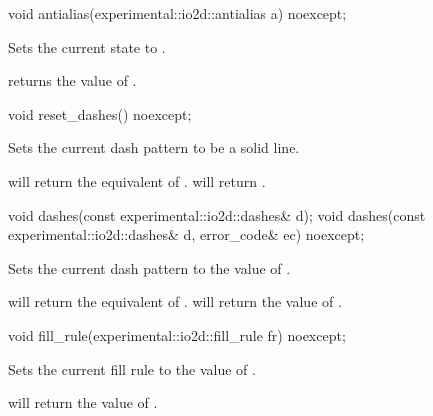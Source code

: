 \begin{itemdecl}
void antialias(experimental::io2d::antialias a) noexcept;
\end{itemdecl}
\begin{itemdescr}
	\pnum
	\effects
	Sets the current  state to .
	
	\pnum
	\postconditions
	 returns the value of .
\end{itemdescr}

\begin{itemdecl}
void reset_dashes() noexcept;
\end{itemdecl}
\begin{itemdescr}
	\pnum
	\effects
	Sets the current dash pattern to be a solid line.
	
	\pnum
	\postconditions
	 will return the equivalent of .  will return .
\end{itemdescr}

\begin{itemdecl}
void dashes(const experimental::io2d::dashes& d);
void dashes(const experimental::io2d::dashes& d, error_code& ec) noexcept;
\end{itemdecl}
\begin{itemdescr}
	\pnum
	\effects
	Sets the current dash pattern to the value of .
	
	\pnum
	\postconditions
	 will return the equivalent of .  will return the value of .
\end{itemdescr}

\begin{itemdecl}
void fill_rule(experimental::io2d::fill_rule fr) noexcept;
\end{itemdecl}
\begin{itemdescr}
	\pnum
	\effects
	Sets the current fill rule to the value of .
	
	\pnum
	\postconditions
	 will return the value of .
\end{itemdescr}

